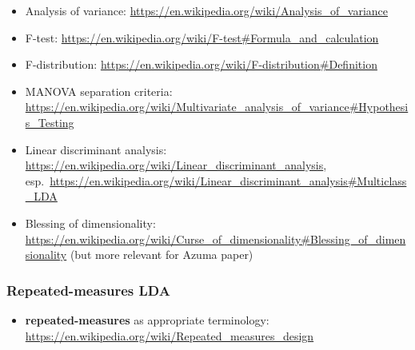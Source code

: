 \documentclass[a4paper]{article}
\begin{document}
\begin{itemize}
\item Analysis of variance: \url{https://en.wikipedia.org/wiki/Analysis_of_variance}
\item F-test: \url{https://en.wikipedia.org/wiki/F-test#Formula_and_calculation}
\item F-distribution: \url{https://en.wikipedia.org/wiki/F-distribution#Definition}
\item MANOVA separation criteria: \url{https://en.wikipedia.org/wiki/Multivariate_analysis_of_variance#Hypothesis_Testing}
\item Linear discriminant analysis: \url{https://en.wikipedia.org/wiki/Linear_discriminant_analysis}, esp.\ \url{https://en.wikipedia.org/wiki/Linear_discriminant_analysis#Multiclass_LDA}
\item Blessing of dimensionality: \url{https://en.wikipedia.org/wiki/Curse_of_dimensionality#Blessing_of_dimensionality} (but more relevant for Azuma paper)
\end{itemize}

\subsubsection{Repeated-measures LDA}
\label{sec:algorithms:lda:repeated}

\begin{itemize}
\item \textbf{repeated-measures} as appropriate terminology: \url{https://en.wikipedia.org/wiki/Repeated_measures_design}
\end{itemize}


\section{}
\label{sec:A}

\subsection{}
\label{sec:A:}


\section{}
\label{sec:B}
\end{document}
